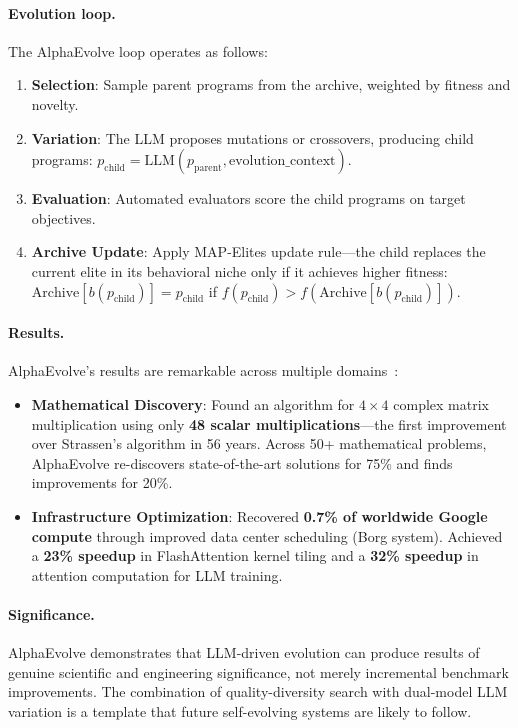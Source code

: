 \paragraph{Evolution loop.}
The AlphaEvolve loop operates as follows:
\begin{enumerate}
    \item \textbf{Selection}: Sample parent programs from the archive, weighted by fitness and novelty.
    \item \textbf{Variation}: The LLM proposes mutations or crossovers, producing child programs: $p_{\text{child}} = \text{LLM}(p_{\text{parent}}, \text{evolution\_context})$.
    \item \textbf{Evaluation}: Automated evaluators score the child programs on target objectives.
    \item \textbf{Archive Update}: Apply MAP-Elites update rule---the child replaces the current elite in its behavioral niche only if it achieves higher fitness: $\text{Archive}[b(p_{\text{child}})] = p_{\text{child}}$ if $f(p_{\text{child}}) > f(\text{Archive}[b(p_{\text{child}})])$.
\end{enumerate}

\paragraph{Results.}
AlphaEvolve's results are remarkable across multiple domains~\citep{novikov2025alphaevolve}:

\begin{itemize}
    \item \textbf{Mathematical Discovery}: Found an algorithm for $4\times4$ complex matrix multiplication using only \textbf{48 scalar multiplications}---the first improvement over Strassen's algorithm in 56 years. Across 50+ mathematical problems, AlphaEvolve re-discovers state-of-the-art solutions for 75\% and finds improvements for 20\%.
    \item \textbf{Infrastructure Optimization}: Recovered \textbf{0.7\% of worldwide Google compute} through improved data center scheduling (Borg system). Achieved a \textbf{23\% speedup} in FlashAttention kernel tiling and a \textbf{32\% speedup} in attention computation for LLM training.
\end{itemize}

\paragraph{Significance.}
AlphaEvolve demonstrates that LLM-driven evolution can produce results of genuine scientific and engineering significance, not merely incremental benchmark improvements. The combination of quality-diversity search with dual-model LLM variation is a template that future self-evolving systems are likely to follow.

